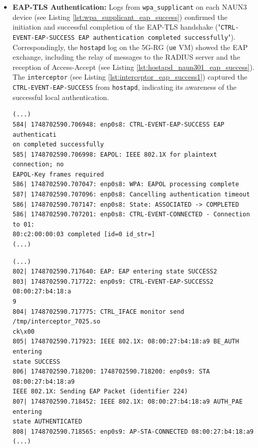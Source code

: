 \begin{itemize}
    \item \textbf{EAP-TLS Authentication:} Logs from \texttt{wpa\_supplicant} on each \ac{NAUN3} device (see Listing \ref{lst:wpa_supplicant_eap_success}) confirmed the initiation and successful completion of the \ac{EAP-TLS} handshake ("\texttt{CTRL-EVENT-EAP-SUCCESS EAP authentication completed successfully}"). Correspondingly, the \texttt{hostapd} log on the 5G-RG (\texttt{ue} \ac{VM}) showed the \ac{EAP} exchange, including the relay of messages to the \ac{RADIUS} server and the reception of Access-Accept (see Listing \ref{lst:hostapd_naun301_eap_success}). The \texttt{interceptor} (see Listing \ref{lst:interceptor_eap_success1}) captured the \texttt{CTRL-EVENT-EAP-SUCCESS} from \texttt{hostapd}, indicating its awareness of the successful local authentication.

    \begin{lstlisting}[caption=wpa\_supplicant successful authentication,label={lst:wpa_supplicant_eap_success}]
(...)
584| 1748702590.706948: enp0s8: CTRL-EVENT-EAP-SUCCESS EAP authenticati
on completed successfully
585| 1748702590.706998: EAPOL: IEEE 802.1X for plaintext connection; no 
EAPOL-Key frames required
586| 1748702590.707047: enp0s8: WPA: EAPOL processing complete
587| 1748702590.707096: enp0s8: Cancelling authentication timeout
586| 1748702590.707147: enp0s8: State: ASSOCIATED -> COMPLETED
586| 1748702590.707201: enp0s8: CTRL-EVENT-CONNECTED - Connection to 01:
80:c2:00:00:03 completed [id=0 id_str=]
(...)
    \end{lstlisting}

    \begin{lstlisting}[caption=\texttt{hostapd} successful authentication,label={lst:hostapd_naun301_eap_success}]
(...)
802| 1748702590.717640: EAP: EAP entering state SUCCESS2
803| 1748702590.717722: enp0s9: CTRL-EVENT-EAP-SUCCESS2 08:00:27:b4:18:a
9
804| 1748702590.717775: CTRL_IFACE monitor send /tmp/interceptor_7025.so
ck\x00
805| 1748702590.717923: IEEE 802.1X: 08:00:27:b4:18:a9 BE_AUTH entering 
state SUCCESS
806| 1748702590.718200: 1748702590.718200: enp0s9: STA 08:00:27:b4:18:a9 
IEEE 802.1X: Sending EAP Packet (identifier 224)
807| 1748702590.718452: IEEE 802.1X: 08:00:27:b4:18:a9 AUTH_PAE entering 
state AUTHENTICATED
808| 1748702590.718565: enp0s9: AP-STA-CONNECTED 08:00:27:b4:18:a9
(...)
    \end{lstlisting}


\end{itemize}
